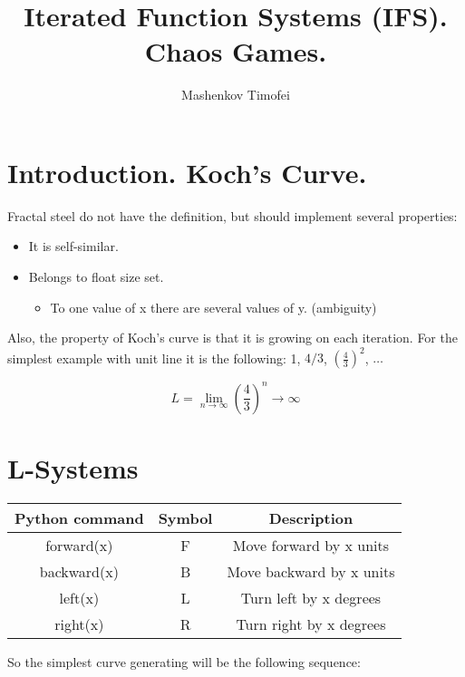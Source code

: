 \documentclass{article}
\title{Iterated Function Systems (IFS). Chaos Games.}
\author{Mashenkov Timofei}
\begin{document}
\maketitle{}

\section*{Introduction. Koch's Curve.}

Fractal steel do not have the definition, but should implement several properties:

\begin{itemize}
  \item It is self-similar.
  \item Belongs to float size set.
    \begin{itemize}
      \item To one value of x there are several values of y. (ambiguity)
    \end{itemize}
\end{itemize}

Also, the property of Koch's curve is that it is growing on each iteration. For the simplest example with unit line it
is the following: 1, $4/3$, $(\frac{4}{3})^2$, $\dots$

\begin{equation*}
  L = \lim_{n \to \infty} \left(\frac{4}{3}\right)^n \to \infty
\end{equation*}

\section*{L-Systems}

\begin{center}
  \begin{tabular}{ |c|c|c| }
    \hline 
    Python command & Symbol & Description \\
    \hline 
    forward(x) & F & Move forward by x units \\
    backward(x) & B & Move backward by x units \\
    left(x) & L & Turn left by x degrees \\
    right(x) & R & Turn right by x degrees \\
    \hline
  \end{tabular} 
\end{center}

So the simplest curve generating will be the following sequence:
\end{document}
